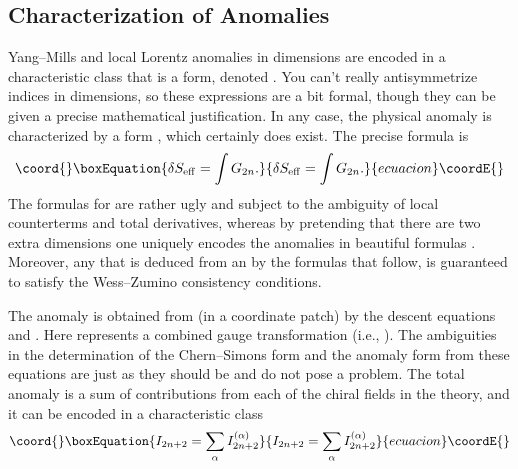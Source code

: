 \documentclass[a4paper,12pt]{article}
\begin{document}
\subsection{Characterization of Anomalies}
Yang--Mills and local Lorentz anomalies in \coordHE{} dimensions are
encoded in a characteristic class that is a \coordHE{} form, denoted
\coordHE{}.  You can't really antisymmetrize \coordHE{} indices in
\coordHE{} dimensions, so these expressions are a bit formal, though
they can be given a precise mathematical justification. In any
case, the physical anomaly is characterized by a \coordHE{} form \coordHE{},
which certainly does exist. The precise formula is
\begin{equation}\coord{}\boxEquation{
\delta S_{\rm eff} = \int G_{2n}.
}{
\delta S_{\rm eff} = \int G_{2n}.
}{ecuacion}\coordE{}\end{equation}
The formulas for \coordHE{} are rather ugly and subject to the
ambiguity of local counterterms and total derivatives, 
whereas by pretending that there
are two extra dimensions one uniquely encodes the anomalies in
beautiful formulas \coordHE{}. Moreover, any \coordHE{} that is
deduced from an \coordHE{} by the formulas that follow,  is
guaranteed to satisfy the Wess--Zumino consistency conditions.

The anomaly \coordHE{} is obtained from \coordHE{} (in a coordinate
patch) by the descent equations \coordHE{} and
\coordHE{}. Here \myHighlight{$\delta$}\coordHE{} represents a
combined gauge transformation (i.e., \myHighlight{$\delta = \delta_{\Lambda} +
\delta_{\Theta}$}\coordHE{}). The ambiguities in the determination of the
Chern--Simons form \coordHE{} and the anomaly form \coordHE{}
from these equations are just as they should be and do not pose a
problem. The total anomaly is a sum of contributions from each of
the chiral fields in the theory, and it can be encoded in a
characteristic class
\begin{equation}\coord{}\boxEquation{
I_{2n+2} = \sum_{\alpha} I^{(\alpha)}_{2n+2}
}{
I_{2n+2} = \sum_{\alpha} I^{(\alpha)}_{2n+2}
}{ecuacion}\coordE{}\end{equation}
\end{document}
